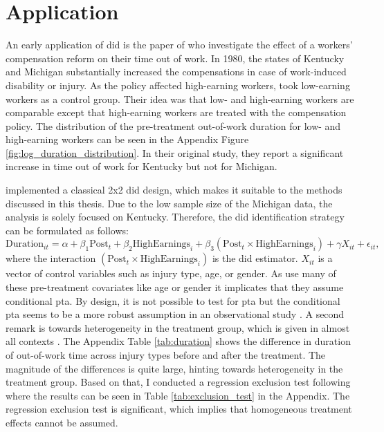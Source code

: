 \section{Application}

An early application of \ac{did} is the paper of \citet{meyer1990workers} who investigate the effect of a workers' compensation reform on their time out of work.
In 1980, the states of Kentucky and Michigan substantially increased the compensations in case of work-induced disability or injury.
As the policy affected high-earning workers, \citet{meyer1990workers} took low-earning workers as a control group.
Their idea was that low- and high-earning workers are comparable except that high-earning workers are treated with the compensation policy.
The distribution of the pre-treatment out-of-work duration for low- and high-earning workers can be seen in the Appendix Figure \ref{fig:log_duration_distribution}.
In their original study, they report a significant increase in time out of work for Kentucky but not for Michigan.

\citet{meyer1990workers} implemented a classical 2x2 \ac{did} design, which makes it suitable to the methods discussed in this thesis.
Due to the low sample size of the Michigan data, the analysis is solely focused on Kentucky.
Therefore, the \ac{did} identification strategy can be formulated as follows:
\begin{equation}
\text{Duration}_{it} = \alpha + \beta_1 \text{Post}_t + \beta_2 \text{HighEarnings}_i + \beta_3 (\text{Post}_t \times \text{HighEarnings}_i) + \gamma X_{it} + \epsilon_{it},
\label{eq:duration}
\end{equation}
where the interaction $(\text{Post}_t \times \text{HighEarnings}_i)$ is the \ac{did} estimator.
$X_{it}$ is a vector of control variables such as injury type, age, or gender.
As \citet{meyer1990workers} use many of these pre-treatment covariates like age or gender it implicates that they assume conditional \ac{pta}.
By design, it is not possible to test for \ac{pta} but the conditional \ac{pta} seems to be a more robust assumption in an observational study \citep{santannaDoublyRobustDifferenceindifferences2020}.
A second remark is towards heterogeneity in the treatment group, which is given in almost all contexts \citep{DeepLearningIndividual2021}.
The Appendix Table \ref{tab:duration} shows the difference in duration of out-of-work time across injury types before and after the treatment.
The magnitude of the differences is quite large, hinting towards heterogeneity in the treatment group.
Based on that, I conducted a regression exclusion test following \citet{hansen2022econometrics} where the results can be seen in Table \ref{tab:exclusion_test} in the Appendix.
The regression exclusion test is significant, which implies that homogeneous treatment effects cannot be assumed.

